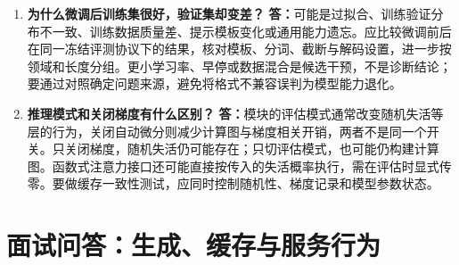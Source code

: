 \documentclass[UTF8,12pt,a4paper,fontset=fandol]{ctexart}
\begin{document}
\begin{enumerate}[resume*=trquestions]
\item \textbf{为什么微调后训练集很好，验证集却变差？}
\textbf{答：}可能是过拟合、训练验证分布不一致、训练数据质量差、提示模板变化或通用能力遗忘。应比较微调前后在同一冻结评测协议下的结果，核对模板、分词、截断与解码设置，进一步按领域和长度分组。更小学习率、早停或数据混合是候选干预，不是诊断结论；要通过对照确定问题来源，避免将格式不兼容误判为模型能力退化。

\item \textbf{推理模式和关闭梯度有什么区别？}
\textbf{答：}模块的评估模式通常改变随机失活等层的行为，关闭自动微分则减少计算图与梯度相关开销，两者不是同一个开关。只关闭梯度，随机失活仍可能存在；只切评估模式，也可能仍构建计算图。函数式注意力接口还可能直接按传入的失活概率执行，需在评估时显式传零。要做缓存一致性测试，应同时控制随机性、梯度记录和模型参数状态。
\end{enumerate}

\section{面试问答：生成、缓存与服务行为}
\label{sec:tr-qa-cache}
\end{document}
